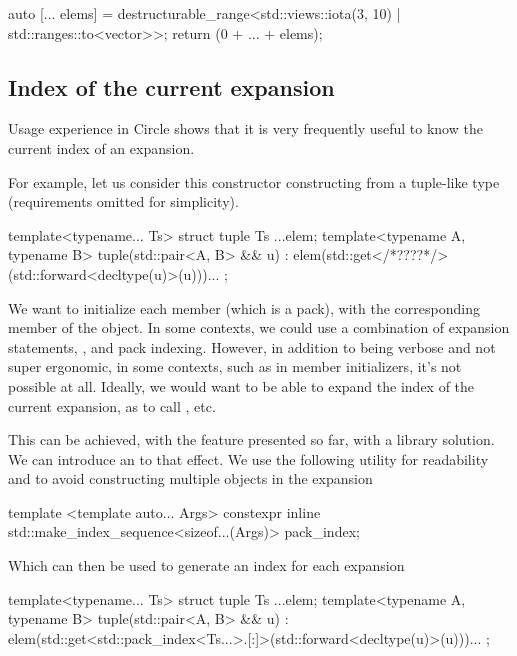 \documentclass{wg21}
\begin{document}
\begin{colorblock}
auto [... elems] = destructurable_range<std::views::iota(3, 10) | std::ranges::to<vector>>{};
return (0 + ... + elems);
\end{colorblock}

\subsection{Index of the current expansion}
\label{sec:expansionindex}

Usage experience in Circle shows that it is very frequently useful
to know the current index of an expansion.

For example, let us consider this  constructor constructing from a tuple-like type
(requirements omitted for simplicity).

\begin{colorblock}
template<typename... Ts>
struct tuple {
    Ts ...elem;
    template<typename A, typename B>
    tuple(std::pair<A, B> && u)
    : elem(std::get</*????*/>(std::forward<decltype(u)>(u)))... { }
};
\end{colorblock}

We want to initialize each member  (which is a pack), with the corresponding member of the  object.
In some contexts, we could use a combination of expansion statements, , and pack indexing.
However, in addition to being verbose and not super ergonomic, in some contexts, such as in member initializers, it's not possible at all.
Ideally, we would want to be able to expand the index of the current expansion, as to call , etc.

This can be achieved, with the feature presented so far, with a library solution.
We can introduce an  to that effect. We use the following utility for readability and to avoid constructing multiple objects in the expansion

\begin{colorblock}
template <template auto... Args>
constexpr inline std::make_index_sequence<sizeof...(Args)> pack_index;
\end{colorblock}

Which can then be used to generate an index for each expansion

\begin{colorblock}
template<typename... Ts>
struct tuple {
    Ts ...elem;
    template<typename A, typename B>
    tuple(std::pair<A, B> && u)
    : elem(std::get<std::pack_index<Ts...>.[:]>(std::forward<decltype(u)>(u)))... { }
};
\end{colorblock}
\end{document}
